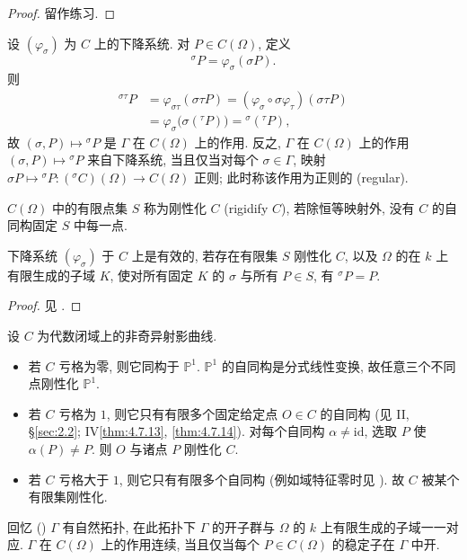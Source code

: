 \begin{proof}
留作练习.
\end{proof}

设 $(\varphi_\sigma)$ 为 $C$ 上的下降系统. 对 $P\in C(\Omega)$, 定义
\[
{}^{\sigma}P = \varphi_\sigma(\sigma P).
\]
则
\[
\begin{aligned}
{}^{\sigma\tau}P
&= \varphi_{\sigma\tau}(\sigma\tau P)
= (\varphi_\sigma\circ\sigma\varphi_\tau)(\sigma\tau P)\\
&= \varphi_\sigma\bigl(\sigma({}^{\tau}P)\bigr)
= {}^{\sigma}({}^{\tau}P),
\end{aligned}
\]
故 $(\sigma, P)\mapsto{}^{\sigma}P$ 是 $\Gamma$ 在 $C(\Omega)$ 上的作用. 反之, $\Gamma$ 在 $C(\Omega)$ 上的作用 $(\sigma, P)\mapsto{}^{\sigma}P$ 来自下降系统, 当且仅当对每个 $\sigma\in\Gamma$, 映射 $\sigma P\mapsto{}^{\sigma}P\colon({}^{\sigma}C)(\Omega)\to C(\Omega)$ 正则; 此时称该作用为正则的 (regular).

$C(\Omega)$ 中的有限点集 $S$ 称为刚性化 $C$ (rigidify $C$), 若除恒等映射外, 没有 $C$ 的自同构固定 $S$ 中每一点.

\begin{proposition} \label{thm:1.5.3} 
下降系统 $(\varphi_\sigma)$ 于 $C$ 上是有效的, 若存在有限集 $S$ 刚性化 $C$, 以及 $\Omega$ 的在 $k$ 上有限生成的子域 $K$, 使对所有固定 $K$ 的 $\sigma$ 与所有 $P\in S$, 有 ${}^{\sigma}P = P$.
\end{proposition}

\begin{proof}
见 \cite[1.2]{milne1999}.
\end{proof}

\begin{remark} \label{thm:1.5.4} 
设 $C$ 为代数闭域上的非奇异射影曲线.
\begin{itemize}
\item 若 $C$ 亏格为零, 则它同构于 $\mathbb{P}^1$. $\mathbb{P}^1$ 的自同构是分式线性变换, 故任意三个不同点刚性化 $\mathbb{P}^1$.
\item 若 $C$ 亏格为 $1$, 则它只有有限多个固定给定点 $O\in C$ 的自同构 (见 II, \S\ref{sec:2.2}; IV\ref{thm:4.7.13}, \ref{thm:4.7.14}). 对每个自同构 $\alpha\neq\mathrm{id}$, 选取 $P$ 使 $\alpha(P)\neq P$. 则 $O$ 与诸点 $P$ 刚性化 $C$.
\item 若 $C$ 亏格大于 $1$, 则它只有有限多个自同构 (例如域特征零时见 \cite[IV, Exercise 5.2]{hartshorne1977}). 故 $C$ 被某个有限集刚性化.
\end{itemize}
\end{remark}

回忆 (\cite[\S 9]{milne-ft}) $\Gamma$ 有自然拓扑, 在此拓扑下 $\Gamma$ 的开子群与 $\Omega$ 的 $k$ 上有限生成的子域一一对应. $\Gamma$ 在 $C(\Omega)$ 上的作用连续, 当且仅当每个 $P\in C(\Omega)$ 的稳定子在 $\Gamma$ 中开.

